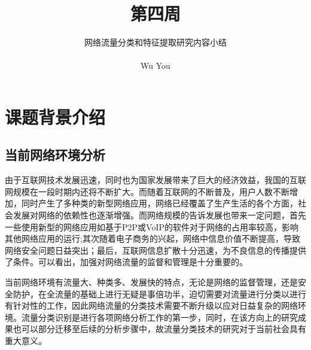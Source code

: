 \documentclass[a4papper]{article}
\title{}
\title{第四周}
\author{网络流量分类和特征提取研究内容小结\\\\
Wu You\\ 
}
\begin{document}
\maketitle
\tableofcontents
\thispagestyle{empty}%
\newpage
\setcounter{page}{1}%
\setcounter{section}{0}%
\section{课题背景介绍}
\subsection{当前网络环境分析}
\par\setlength{\parindent}{2em} %
由于互联网技术发展迅速，同时也为国家发展带来了巨大的经济效益，我国的互联网规模在一段时期内还将不断扩大。而随着互联网的不断普及，用户人数不断增加，同时产生了多种类的新型网络应用，网络已经覆盖了生产生活的各个方面，社会发展对网络的依赖性也逐渐增强。而网络规模的告诉发展也带来一定问题，首先一些使用新型的网络应用如基于P2P或VoIP的软件对于网络的占用率较高，影响其他网络应用的运行;其次随着电子商务的兴起，网络中信息价值不断提高，导致网络安全问题日益突出；最后，互联网信息扩散十分迅速，为不良信息的传播提供了条件。\cite{林冠洲2011网络流量识别关键技术研究}可以看出，加强对网络流量的监督和管理是十分重要的。
\par\setlength{\parindent}{2em} %
当前网络环境有流量大、种类多、发展快的特点，无论是网络的监督管理，还是安全防护，在全流量的基础上进行无疑是事倍功半，迫切需要对流量进行分类以进行有针对性的工作，因此网络流量的分类技术需要不断升级以应对日益复杂的网络环境。流量分类识别是进行各项网络分析工作的第一步，同时，在该方向上的研究成果也可以部分迁移至后续的分析步骤中，故流量分类技术的研究对于当前社会具有重大意义。
\end{document}
